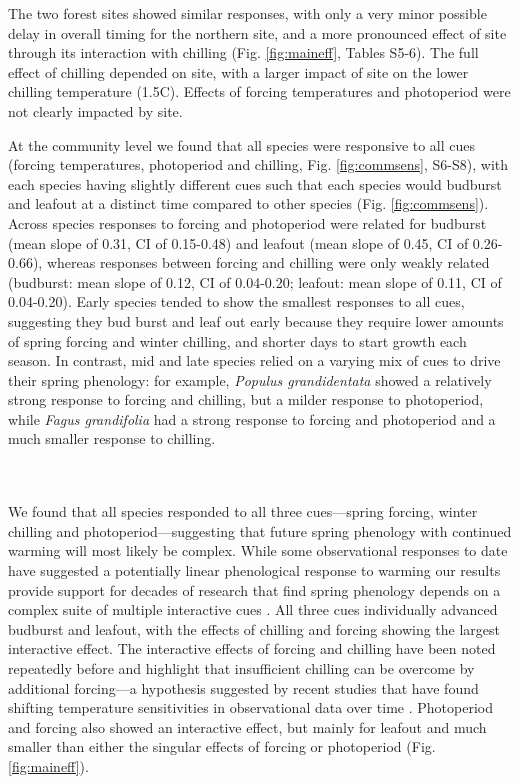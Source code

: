 \documentclass[11pt]{article}
\begin{document}
The two forest sites showed similar responses, with only a very minor possible delay in overall timing for the northern site, and a more pronounced effect of site through its interaction with chilling (Fig. \ref{fig:maineff}, Tables S5-6). The full effect of chilling depended on site, with a larger impact of site on the lower chilling temperature (1.5\degree C). Effects of forcing temperatures and photoperiod were not clearly impacted by site. 

At the community level we found that all species were responsive to all cues (forcing temperatures, photoperiod and chilling, Fig. \ref{fig:commsens}, S6-S8), with each species having slightly different cues such that each species would budburst and leafout at a distinct time compared to other species (Fig. \ref{fig:commsens}). Across species responses to forcing and photoperiod were related for budburst (mean slope of 0.31, CI of 0.15-0.48) and leafout (mean slope of 0.45, CI of 0.26-0.66), whereas responses between forcing and chilling were only weakly related (budburst: mean slope of 0.12, CI of 0.04-0.20; leafout: mean slope of 0.11, CI of 0.04-0.20). Early species tended to show the smallest responses to all cues, suggesting they bud burst and leaf out early because they require lower amounts of spring forcing and winter chilling, and shorter days to start growth each season. In contrast, mid and late species relied on a varying mix of cues to drive their spring phenology: for example, \emph{Populus grandidentata} showed a relatively strong response to forcing and chilling, but a milder response to photoperiod, while \emph{Fagus grandifolia} had a strong response to forcing and photoperiod and a much smaller response to chilling.


\vspace{2ex}\\
\vspace{2ex}\\
We found that all species responded to all three cues---spring forcing, winter chilling and photoperiod---suggesting that future spring phenology with continued warming will most likely be complex. While some observational responses to date have suggested a potentially linear phenological response to warming \citep{Ellwood2012} our results provide support for decades of research that find spring phenology depends on a complex suite of multiple interactive cues \citep[e.g.,][]{Heide:1993,Caffarra:2011aa}. All three cues individually advanced budburst and leafout, with the effects of chilling and forcing showing the largest interactive effect. The interactive effects of forcing and chilling have been noted repeatedly before \citep[e.g.,][]{Heide:1993b,Caffarra:2011aa} and highlight that insufficient chilling can be overcome by additional forcing---a hypothesis suggested by recent studies that have found shifting temperature sensitivities in observational data over time \citep{yu2010,fu2015}. Photoperiod and forcing also showed an interactive effect, but mainly for leafout and much smaller than either the singular effects of forcing or photoperiod (Fig. \ref{fig:maineff}). \\
\end{document}
